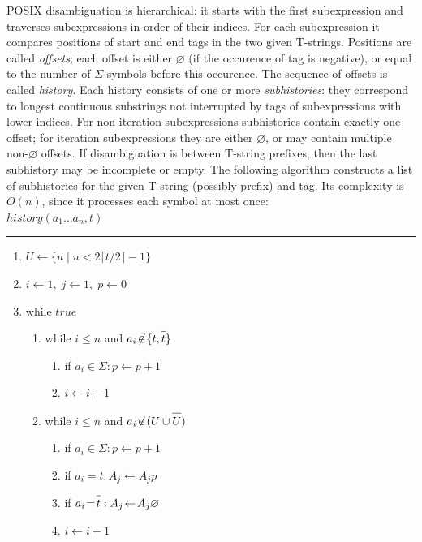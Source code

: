 \documentclass{article}
\newcommand{\Xset}{\!\leftarrow\!}
\newcommand{\Xin}{\!\in\!}
\newcommand{\Xeq}{\!=\!}
\newcommand*{\Xbar}[1]{\overline{#1\vphantom{\bar{#1}}}}
\theoremstyle{definition}
\begin{document}
\begin{multicols}{2}
POSIX disambiguation is hierarchical:
it starts with the first subexpression and traverses subexpressions in order of their indices.
For each subexpression it compares positions of start and end tags in the two given T-strings.
Positions are called \emph{offsets}; each offset is either $\varnothing$ (if the occurence of tag is negative),
or equal to the number of $\Sigma$-symbols before this occurence.
The sequence of offsets is called \emph{history}.
Each history consists of one or more \emph{subhistories}:
they correspond to longest continuous substrings not interrupted by tags of subexpressions with lower indices.
For non-iteration subexpressions subhistories contain exactly one offset;
for iteration subexpressions they are either $\varnothing$, or may contain multiple non-$\varnothing$ offsets.
If disambiguation is between T-string prefixes, then the last subhistory may be incomplete or empty.
The following algorithm constructs a list of subhistories for the given T-string (possibly prefix) and tag.
Its complexity is $O(n)$, since it processes each symbol at most once:
\\

    $history(a_1 \dots a_n, t)$
    \hrule
    \begin{enumerate}[leftmargin=0in]
        \smallskip
        \item[] $U \Xset \{ u \mid u < 2 \lceil t / 2 \rceil \!-\! 1 \}$
        \item[] $i \Xset 1, \; j \Xset 1, \; p \Xset 0$

        \item[] while $true$
        \begin{enumerate}

            \item[] while $i \leq n$ and $a_i \!\not\in\! \{t, \Xbar{t}\}$
            \begin{enumerate}
                \item[] if $a_i \Xin \Sigma: p \Xset p \!+\! 1$
                \item[] $i \Xset i \!+\! 1$
            \end{enumerate}

            \item[] while $i \leq n$ and $a_i \!\not\in\! (U \cup \Xbar{U})$
            \begin{enumerate}
                \item[] if $a_i \Xin \Sigma: p \Xset p \!+\! 1$
                \item[] if $a_i \Xeq t: A_j \Xset A_j p$
                \item[] if $a_i \Xeq \Xbar{t}: A_j \Xset A_j \varnothing$
                \item[] $i \Xset i \!+\! 1$
            \end{enumerate}


\end{enumerate}
\end{enumerate}
\end{multicols}
\end{document}
